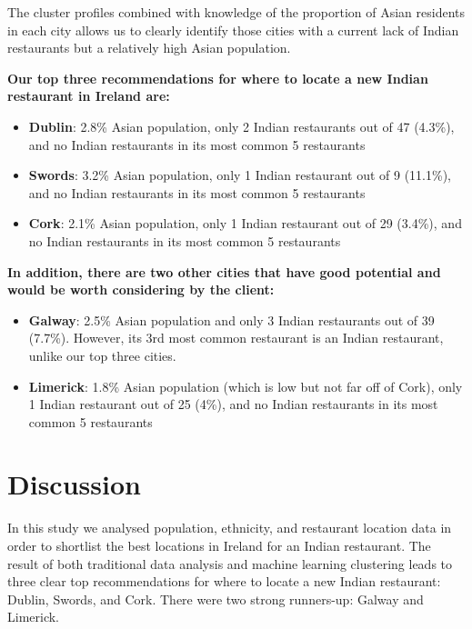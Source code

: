 \documentclass[a4paper,11pt]{article}
\begin{document}
The cluster profiles combined with knowledge of the proportion of Asian residents in each city allows us to clearly identify those cities with a current lack of Indian restaurants but a relatively high Asian population. 

\textbf{Our top three recommendations for where to locate a new Indian restaurant in Ireland are:}

\begin{itemize}
	\item \textbf{Dublin}: 2.8\% Asian population, only 2 Indian restaurants out of 47 (4.3\%), and no Indian restaurants in its most common 5 restaurants
	\item \textbf{Swords}: 3.2\% Asian population, only 1 Indian restaurant out of 9 (11.1\%), and no Indian restaurants in its most common 5 restaurants
	\item \textbf{Cork}: 2.1\% Asian population, only 1 Indian restaurant out of 29 (3.4\%), and no Indian restaurants in its most common 5 restaurants
\end{itemize}

\textbf{In addition, there are two other cities that have good potential and would be worth considering by the client:}  

\begin{itemize}
	\item \textbf{Galway}: 2.5\% Asian population and only 3 Indian restaurants out of 39 (7.7\%). However, its 3rd most common restaurant is an Indian restaurant, unlike our top three cities.
	\item \textbf{Limerick}: 1.8\% Asian population (which is low but not far off of Cork), only 1 Indian restaurant out of 25 (4\%), and no Indian restaurants in its most common 5 restaurants
\end{itemize}

\section{Discussion}\label{sec: discussion}
In this study we analysed population, ethnicity, and restaurant location data in order to shortlist the best locations in Ireland for an Indian restaurant. The result of both traditional data analysis and machine learning clustering leads to three clear top recommendations for where to locate a new Indian restaurant: Dublin, Swords, and Cork. There were two strong runners-up: Galway and Limerick.
\end{document}

